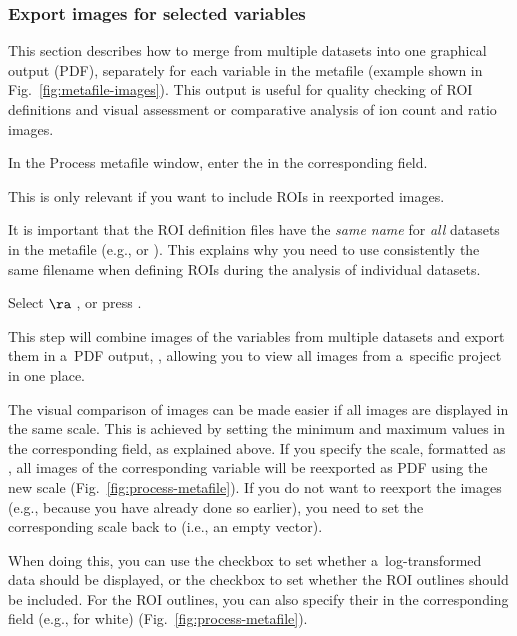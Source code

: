 \subsubsection{Export images for selected variables}
\label{sec:621}
\setcounter{step}{0}

\goldbox{}
This section describes how to merge  from multiple datasets into one graphical output (PDF), separately for each variable in the metafile (example shown in Fig.~\ref{fig:metafile-images}). This output is useful for quality checking of ROI definitions and visual assessment or comparative analysis of ion count and ratio images.
\tcbe

\s In the Process metafile window, enter the  in the corresponding field.

\nb
\bul This is only relevant if you want to include ROIs in reexported images.

\bul It is important that the ROI definition files have the \emph{same name} for \emph{all} datasets in the metafile (e.g.,  or ). This explains why you need to use consistently the same filename when defining ROIs during the analysis of individual datasets.

\s Select  $\ra$ , or press . 

\nb
\bul This step will combine images of the variables from multiple datasets and export them in a~PDF output, , allowing you to view all images from a~specific project in one place.

\bul The visual comparison of images can be made easier if all images are displayed in the same scale. This is achieved by setting the minimum and maximum values in the corresponding  field, as explained above. If you specify the scale, formatted as , all images of the corresponding variable will be reexported as PDF using the new scale (Fig.~\ref{fig:process-metafile}). If you do not want to reexport the images (e.g., because you have already done so earlier), you need to set the corresponding scale back to \ttt{[]} (i.e., an empty vector).

\bul When doing this, you can use the  checkbox to set whether a~log-transformed data should be displayed, or the  checkbox to set whether the ROI outlines should be included. For the ROI outlines, you can also specify their  in the corresponding field (e.g.,  for white) (Fig.~\ref{fig:process-metafile}). 

